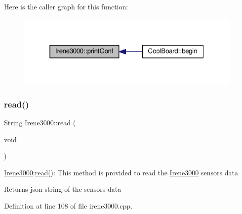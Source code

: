 Here is the caller graph for this function\+:\nopagebreak
\begin{figure}[H]
\begin{center}
\leavevmode
\includegraphics[width=313pt]{d6/d03/class_irene3000_a7bc2414100b5e19eacc6630fa34b2654_icgraph}
\end{center}
\end{figure}
\mbox{\label{class_irene3000_a852a170feea994ea1df01c6b245b5d9a}} 
\subsubsection{\texorpdfstring{read()}{read()}}
{\footnotesize\ttfamily String Irene3000\+::read (\begin{DoxyParamCaption}\item[{void}]{ }\end{DoxyParamCaption})}

\hyperlink{class_irene3000}{Irene3000}\+:\hyperlink{class_irene3000_a852a170feea994ea1df01c6b245b5d9a}{read()}\+: This method is provided to read the \hyperlink{class_irene3000}{Irene3000} sensors data

\begin{DoxyReturn}{Returns}
json string of the sensors data 
\end{DoxyReturn}


Definition at line 108 of file irene3000.\+cpp.


